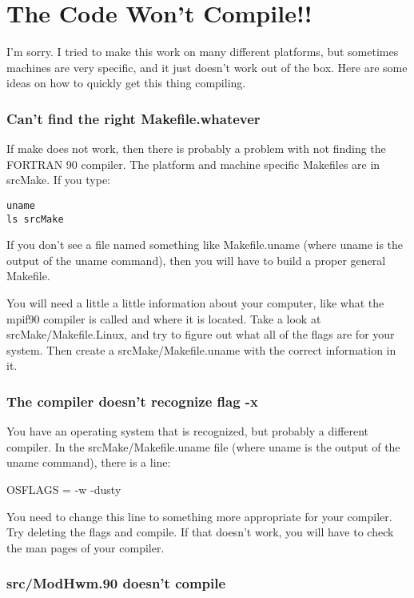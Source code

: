 \section{The Code Won't Compile!!}
I'm sorry. I tried to make this work on many different platforms, but
sometimes machines are very specific, and it just doesn't work out of
the box. Here are some ideas on how to quickly get this thing
compiling.

\subsubsection{Can't find the right Makefile.whatever}

If make does not work, then there is probably a problem with not
finding the FORTRAN 90 compiler. The platform and machine specific
Makefiles are in srcMake. If you type:
\begin{verbatim}
uname 
ls srcMake
\end{verbatim}

If you don't see a file named something like Makefile.uname (where
uname is the output of the uname command), then you will have to build
a proper general Makefile.

You will need a little a little information about your computer, like
what the mpif90 compiler is called and where it is located. Take a
look at srcMake/Makefile.Linux, and try to figure out what all of the
flags are for your system. Then create a srcMake/Makefile.uname with
the correct information in it.

\subsubsection{The compiler doesn't recognize flag -x}

You have an operating system that is recognized, but probably a
different compiler. In the srcMake/Makefile.uname file (where uname is
the output of the uname command), there is a line:

OSFLAGS	= -w -dusty

You need to change this line to something more appropriate for your
compiler. Try deleting the flags and compile. If that doesn't work,
you will have to check the man pages of your compiler.

\subsubsection{src/ModHwm.90 doesn't compile}

